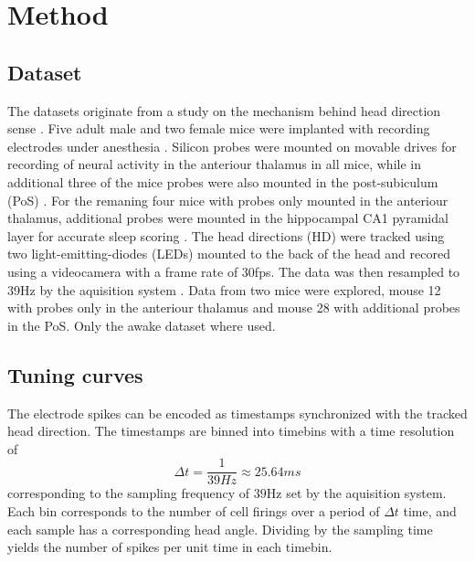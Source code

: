 \section{Method}

\subsection{Dataset}
The datasets originate from a study on the mechanism behind head direction sense \cite{projectdata}.
Five adult male and two female mice were implanted with recording electrodes under anesthesia \cite{projectdata}.
Silicon probes were mounted on movable drives for recording of neural activity in the anteriour thalamus in all mice, while in additional three of the mice probes were also mounted in the post-subiculum (PoS) \cite{projectdata}. For the remaning four mice with probes only mounted in the anteriour thalamus, additional probes were mounted in the hippocampal CA1 pyramidal layer for accurate sleep scoring \cite{projectdata}.
The head directions (HD) were tracked using two light-emitting-diodes (LEDs) mounted to the back of the head and recored using a videocamera with a frame rate of 30fps. The data was then resampled to 39Hz by the aquisition system \cite{projectdata}.
Data from two mice were explored, mouse 12 with probes only in the anteriour thalamus and mouse 28 with additional probes in the PoS. Only the awake dataset where used.
\subsection{Tuning curves}
The electrode spikes can be encoded as timestamps synchronized with the tracked head direction. The timestamps are binned into timebins with a time resolution of 
$$\Delta t = \frac{1}{39Hz} \approx 25.64ms$$ 
corresponding to the sampling frequency of $39$Hz set by the aquisition system.
Each bin corresponds to the number of cell firings over a period of $\Delta t$ time, and each sample has a corresponding head angle.
Dividing by the sampling time yields the number of spikes per unit time in each timebin.

